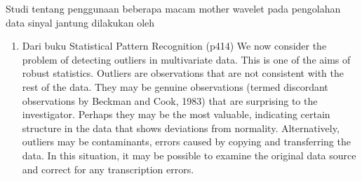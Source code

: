 Studi tentang penggunaan beberapa macam mother wavelet pada pengolahan data
sinyal jantung dilakukan oleh 


\newpage
\begin{enumerate}
  \item Dari buku   Statistical Pattern Recognition (p414)
	We now consider the problem of detecting outliers in multivariate data. This is one of
	the aims of robust statistics. Outliers are observations that are not consistent with the
	rest of the data. They may be genuine observations (termed discordant observations by
	Beckman and Cook, 1983) that are surprising to the investigator. Perhaps they may be
	the most valuable, indicating certain structure in the data that shows deviations from
	normality. Alternatively, outliers may be contaminants, errors caused by copying and
	transferring the data. In this situation, it may be possible to examine the original data
	source and correct for any transcription errors. 
\end{enumerate}

